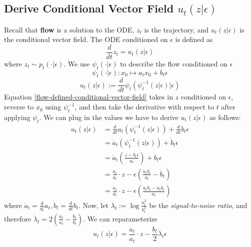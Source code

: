 \subsection{Derive Conditional Vector Field $u_t (z \vert \epsilon)$}
Recall that \textbf{flow} is a solution to the ODE, $z_t$ is the trajectory, and $u_t (z \vert \epsilon)$ is the conditional vector field. The ODE conditioned on $\epsilon$ is defined as
\begin{equation}
    \frac{d}{dt} z_t = u_t(z \vert \epsilon)
\end{equation}
where $z_t \sim p_t(\cdot \vert \epsilon)$. We use $\psi_t (\cdot \vert \epsilon)$ to describe the flow conditioned on $\epsilon$
\begin{equation}
    \psi_t(\cdot | \epsilon) : x_0 \mapsto a_t x_0 + b_t \epsilon
\end{equation}
\begin{equation}
    u_t(z \vert \epsilon) := \frac{d}{dt} \psi_t (\psi_t^{-1} (z \vert \epsilon) \vert \epsilon)
    \label{flow-defined-conditional-vector-field}
\end{equation}
Equation \eqref{flow-defined-conditional-vector-field} takes in $z$ conditioned on $\epsilon$, reverse to $x_0$ using $\psi_{t}^{-1}$, and then take the derivative with respect to $t$ after applying $\psi_t$. We can plug in the values we have to derive $u_t(z \vert \epsilon)$ as follows:
\begin{align}
    u_t(z \vert \epsilon) &= \frac{d}{dt} a_t (\psi^{-1}_{t}(z \vert \epsilon)) + \frac{d}{dt} b_t \epsilon
    \\ &= \dot{a}_t (\psi^{-1}_{t}(z \vert \epsilon)) + \dot{b}_t \epsilon
    \\ &= \dot{a}_t (\frac{z - b_t \epsilon}{a_t}) + \dot{b}_t \epsilon
    \\ &= \frac{\dot{a}_t}{a_t} \cdot z - \epsilon (\frac{\dot{a}_t b_t}{a_t} - \dot{b}_t)
    \\ &= \frac{\dot{a}_t}{a_t} \cdot z - \epsilon (\frac{\dot{a}_t b_t - a_t \dot{b}_t}{a_t})
\end{align}
where $\dot{a}_t = \frac{d}{d_t} a_t, \dot{b}_t = \frac{d}{dt} b_t$. Now, let $\lambda_t := \log \frac{a_t^2}{b_t^2}$ be the \textit{signal-to-noise ratio}, and therefore $\dot{\lambda}_t = 2 (\frac{\dot{a}_t}{a_t} - \frac{\dot{b}_t}{b_t})$. We can reparameterize
\begin{equation}
    u_t(z \vert \epsilon) = \frac{\dot{a}_t}{a_t} \cdot z - \frac{b_t}{2} \dot{\lambda}_t \epsilon
\end{equation}
